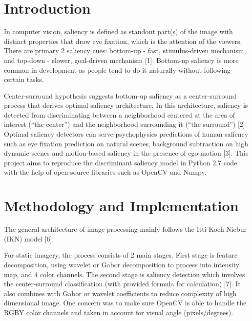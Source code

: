 \documentclass[conference]{IEEEtran}
\begin{document}
\section{Introduction}
In computer vision, saliency is defined as standout part(s) of the image with distinct properties that draw eye fixation, which is the attention of the viewers. There are primary 2 saliency cues: bottom-up - fast, stimulus-driven mechanism, and top-down - slower, goal-driven mechanism [1]. Bottom-up saliency is more common in development as people tend to do it naturally without following certain tasks. 

Center-surround hypothesis suggests bottom-up saliency as a center-surround process that derives optimal saliency architecture. In this architecture, saliency is detected from discriminating between a neighborhood centered at the area of interest (“the center”) and the neighborhood surrounding it (“the surround”) [2]. Optimal saliency detectors can serve psychophysics predictions of human saliency such as eye fixation prediction on natural scenes, background subtraction on high dynamic scenes and motion-based saliency in the presence of ego-motion [3]. This project aims to reproduce the discriminant saliency model in Python 2.7 code with the help of open-source libraries such as OpenCV and Numpy.

\section{Methodology and Implementation}
The general architecture of image processing mainly follows the Itti-Koch-Niebur (IKN) model [6]. 

For static imagery, the process consists of 2 main stages. First stage is feature decomposition, using wavelet or Gabor decomposition to process into intensity map, and 4 color channels. The second stage is saliency detection which involves the center-surround classification (with provided formula for calculation) [7]. It also combines with Gabor or wavelet coefficients to reduce complexity of high dimensional image. One concern was to make sure OpenCV is able to handle the RGBY color channels and taken in account for visual angle (pixels/degrees). 
\end{document}
